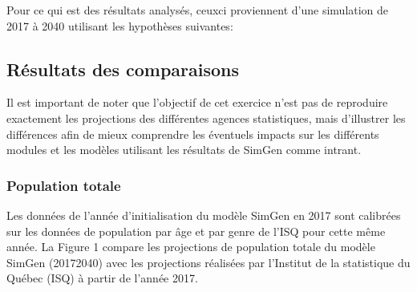 \documentclass[letterpaper,10pt,french]{sphinxmanual}
\begin{document}
Pour ce qui est des résultats analysés, ceux\sphinxhyphen{}ci proviennent d’une simulation de 2017 à 2040 utilisant les hypothèses suivantes:

\begin{sphinxVerbatim}[commandchars=\\\{\}]
  
 
\end{sphinxVerbatim}


\subsection{Résultats des comparaisons}
\label{\detokenize{resultats:resultats-des-comparaisons}}
Il est important de noter que l’objectif de cet exercice n’est pas de reproduire exactement
les projections des différentes agences statistiques,
mais d’illustrer les différences afin de mieux comprendre les éventuels impacts
sur les différents modules et les modèles utilisant les résultats de SimGen comme intrant.


\subsubsection{Population totale}
\label{\detokenize{resultats:population-totale}}
\begin{figure}[htbp]
\centering

\noindent{}
\end{figure}

Les données de l’année d’initialisation du modèle SimGen en 2017 sont calibrées sur les données de population par âge et par genre de l’ISQ pour cette même année. La Figure 1 compare les projections de population totale du modèle SimGen (2017\sphinxhyphen{}2040) avec les projections réalisées par l’Institut de la statistique du Québec (ISQ) à partir de l’année 2017.
\end{document}

